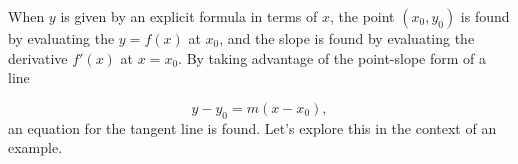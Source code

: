 \documentclass{ximera}
\begin{document}
\begin{image}

\end{image}

When $y$ is given by an explicit formula in terms of $x$, the point
$(x_0,y_0)$ is found by evaluating the $y=f(x)$ at $x_0$, and the
slope is found by evaluating the derivative $f'(x)$ at $x=x_0$.  By
taking advantage of the point-slope form of a line

\[
y-y_0=m\left(x-x_0\right),
\]
an equation for the tangent line is found.  Let's explore this in the
context of an example.
\end{document}
